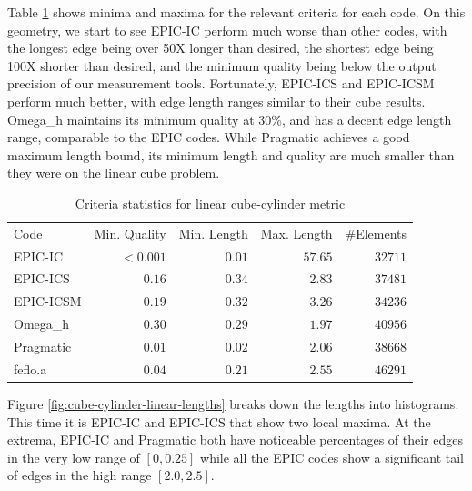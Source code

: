 \documentclass[3p,times,procedia,number]{elsarticle}
\begin{document}
Table \ref{tab:cube-cylinder-linear-stats} shows minima
and maxima for the relevant criteria for each code.
On this geometry, we start to see EPIC-IC perform much
worse than other codes, with the longest edge being over
50X longer than desired, the shortest edge being
100X shorter than desired, and the minimum quality being
below the output precision of our measurement tools.
Fortunately, EPIC-ICS and EPIC-ICSM perform much better,
with edge length ranges similar to their cube results.
Omega\_h maintains its minimum quality at 30\%, and
has a decent edge length range, comparable to the EPIC codes.
While Pragmatic achieves a good maximum length bound,
its minimum length and quality are much smaller than they
were on the linear cube problem.

\begin{table}
\caption{Criteria statistics for linear cube-cylinder metric}
\label{tab:cube-cylinder-linear-stats}
\begin{tabular}{lrrrr}
Code & Min. Quality & Min. Length & Max. Length & \#Elements\\
EPIC-IC    &$<0.001$&       $0.01$&      $57.65$&    $32711$\\
EPIC-ICS   &  $0.16$&       $0.34$&      $ 2.83$&    $37481$\\
EPIC-ICSM  &  $0.19$&       $0.32$&      $ 3.26$&    $34236$\\
Omega\_h   &  $0.30$&       $0.29$&      $ 1.97$&    $40956$\\
Pragmatic  &  $0.01$&       $0.02$&      $ 2.06$&    $38668$\\
feflo.a    &  $0.04$&       $0.21$&      $ 2.55$&    $46291$\\
\end{tabular}
\end{table}

Figure \ref{fig:cube-cylinder-linear-lengths} breaks down the
lengths into histograms.
This time it is EPIC-IC and EPIC-ICS that show two local maxima.
At the extrema, EPIC-IC and Pragmatic both have noticeable
percentages of their edges in the very low range of $[0,0.25]$
while all the EPIC codes show a significant tail of edges
in the high range $[2.0,2.5]$.
\end{document}
